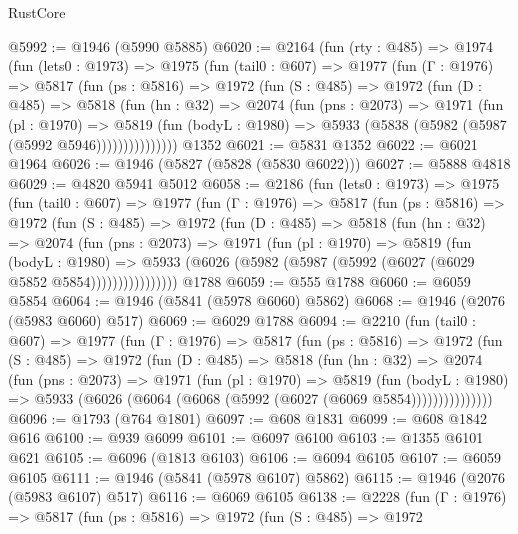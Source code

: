 \begin{lexlean}{RustCore}
\begin{coremodule}
@5992 := @1946 (@5990 @5885)
@6020 := @2164
    (fun (rty : @485) =>
    @1974
      (fun (lets0 : @1973) =>
      @1975
        (fun (tail0 : @607) =>
        @1977
          (fun (Γ : @1976) =>
          @5817
            (fun (ps : @5816) =>
            @1972
              (fun (S : @485) =>
              @1972
                (fun (D : @485) =>
                @5818
                  (fun (hn : @32) =>
                  @2074
                    (fun (pns : @2073) =>
                    @1971
                      (fun (pl : @1970) =>
                      @5819
                        (fun (bodyL : @1980) =>
                        @5933 (@5838 (@5982 (@5987 (@5992 @5946)))))))))))))))
    @1352
@6021 := @5831 @1352
@6022 := @6021 @1964
@6026 := @1946 (@5827 (@5828 (@5830 @6022)))
@6027 := @5888 @4818
@6029 := @4820 @5941 @5012
@6058 := @2186
    (fun (lets0 : @1973) =>
    @1975
      (fun (tail0 : @607) =>
      @1977
        (fun (Γ : @1976) =>
        @5817
          (fun (ps : @5816) =>
          @1972
            (fun (S : @485) =>
            @1972
              (fun (D : @485) =>
              @5818
                (fun (hn : @32) =>
                @2074
                  (fun (pns : @2073) =>
                  @1971
                    (fun (pl : @1970) =>
                    @5819
                      (fun (bodyL : @1980) =>
                      @5933 (@6026 (@5982 (@5987 (@5992 (@6027 (@6029 @5852 @5854))))))))))))))))
    @1788
@6059 := @555 @1788
@6060 := @6059 @5854
@6064 := @1946 (@5841 (@5978 @6060) @5862)
@6068 := @1946 (@2076 (@5983 @6060) @517)
@6069 := @6029 @1788
@6094 := @2210
    (fun (tail0 : @607) =>
    @1977
      (fun (Γ : @1976) =>
      @5817
        (fun (ps : @5816) =>
        @1972
          (fun (S : @485) =>
          @1972
            (fun (D : @485) =>
            @5818
              (fun (hn : @32) =>
              @2074
                (fun (pns : @2073) =>
                @1971
                  (fun (pl : @1970) =>
                  @5819
                    (fun (bodyL : @1980) =>
                    @5933 (@6026 (@6064 (@6068 (@5992 (@6027 (@6069 @5854)))))))))))))))
@6096 := @1793 (@764 @1801)
@6097 := @608 @1831
@6099 := @608 @1842 @616
@6100 := @939 @6099
@6101 := @6097 @6100
@6103 := @1355 @6101 @621
@6105 := @6096 (@1813 @6103)
@6106 := @6094 @6105
@6107 := @6059 @6105
@6111 := @1946 (@5841 (@5978 @6107) @5862)
@6115 := @1946 (@2076 (@5983 @6107) @517)
@6116 := @6069 @6105
@6138 := @2228
    (fun (Γ : @1976) =>
    @5817
      (fun (ps : @5816) =>
      @1972
        (fun (S : @485) =>
        @1972

\end{coremodule}
\end{lexlean}

